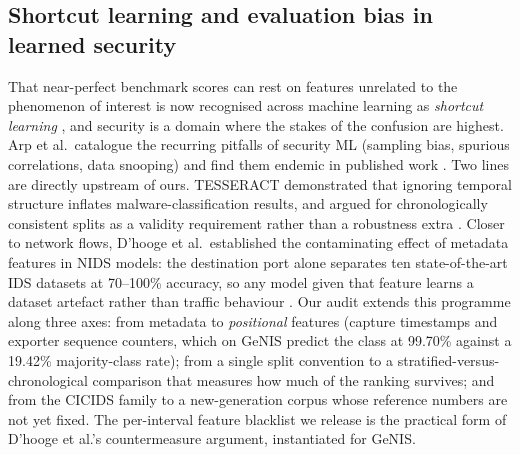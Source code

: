 \documentclass[review,12pt]{elsarticle}
\begin{document}
\subsection{Shortcut learning and evaluation bias in learned security}
That near-perfect benchmark scores can rest on features unrelated to the
phenomenon of interest is now recognised across machine learning as
\emph{shortcut learning} \cite{geirhos2020shortcut}, and security is a
domain where the stakes of the confusion are highest. Arp et al.\ catalogue
the recurring pitfalls of security ML (sampling bias, spurious
correlations, data snooping) and find them endemic in published work
\cite{arp2022dodo}. Two lines are directly upstream of ours. TESSERACT
demonstrated that ignoring temporal structure inflates malware-classification
results, and argued for chronologically consistent splits as a validity
requirement rather than a robustness extra \cite{pendlebury2019tesseract}.
Closer to network flows, D'hooge et al.\ established the contaminating
effect of metadata features in NIDS models: the destination port alone
separates ten state-of-the-art IDS datasets at 70--100\% accuracy, so any
model given that feature learns a dataset artefact rather than traffic
behaviour \cite{dhooge2022metadata}. Our audit extends this programme along
three axes: from metadata to \emph{positional} features (capture timestamps
and exporter sequence counters, which on GeNIS predict the class at
99.70\% against a 19.42\% majority-class rate); from a
single split convention to a stratified-versus-chronological comparison that
measures how much of the ranking survives; and from the CICIDS family to a
new-generation corpus whose reference numbers are not yet fixed. The
per-interval feature blacklist we release is the practical form of
D'hooge et al.'s countermeasure argument, instantiated for GeNIS.
\end{document}
